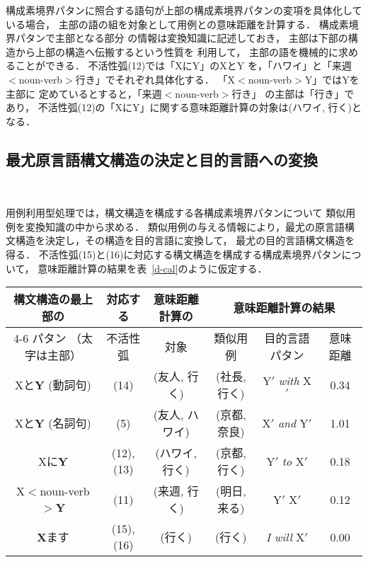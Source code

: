 構成素境界パタンに照合する語句が上部の構成素境界パタンの変項を具体化している場合，
主部の語の組を対象として用例との意味距離を計算する．
構成素境界パタンで主部となる部分\break
の情報は変換知識に記述しておき，
主部は下部の構造から上部の構造へ伝搬するという性質を\break
利用して，
主部の語を機械的に求めることができる．
不活性弧(12)では「XにY」のXとY\break
を，「ハワイ」と「来週
{\footnotesize $<$}noun-verb{\footnotesize $>$}行き」でそれぞれ具体化する．
「X{\footnotesize $<$}noun-verb{\footnotesize $>$}Y」ではYを\break
主部に
定めているとすると，「来週{\footnotesize $<$}noun-verb{\footnotesize $>$}行き」
の主部は「行き」であり，
不活性弧(12)の「XにY」に関する意味距離計算の対象は(ハワイ, 行く)となる．

\subsection{最尤原言語構文構造の決定と目的言語への変換}~\label{output}

用例利用型処理では，構文構造を構成する各構成素境界パタンについて
類似用例を変換知識の中から求める．
類似用例の与える情報により，最尤の原言語構文構造を決定し，その構造を目的言語に変換して，
最尤の目的言語構文構造を得る．
不活性弧(15)と(16)に対応する構文構造を構成する構成素境界パタンについて，
意味距離計算の結果を表~\ref{d-cal}のように仮定する．

\begin{table*}[htb]
\begin{center}
 \caption{意味距離計算の結果}
\label{d-cal}
\begin{small}
\begin{tabular}{|c|c||c|ccc|}
 \hline
 構文構造の最上部の & 対応する & 意味距離計算の & \multicolumn{3}{c|}{意味距離計算の結果} \\ \cline{4-6}
  パタン {\footnotesize （太字は主部）} &  不活性弧 &   対象      & 類似用例 & 目的言語パタン & 意味距離 \\ \hline
 Xと{\bf Y} {\footnotesize (動詞句)} & (14)  &  (友人, 行く) & (社長, 行く) &  Y$'$ {\it with} X$'$ & 0.34\\
Xと{\bf Y} {\footnotesize (名詞句)} &  (5) & (友人, ハワイ) & (京都, 奈良) &  X$'$ {\it and} Y$'$ & 1.01 \\
Xに{\bf Y} & (12),(13)  &  (ハワイ, 行く) & (京都, 行く) &  Y$'$ {\it to} X$'$ & 0.18 \\
X{\footnotesize $<$}noun-verb{\footnotesize $>$}{\bf Y} &   (11) & (来週, 行く) & (明日, 来る) &  Y$'$ X$'$ & 0.12 \\
 {\bf X}ます  &  (15),(16) & (行く) & (行く) &  {\it I will} X$'$ & 0.00 \\ \hline
\end{tabular}
\end{small}
\end{center}
\end{table*}

